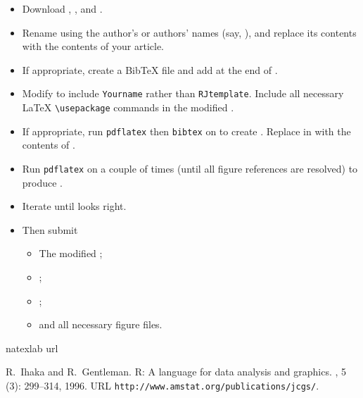 \begin{itemize}

\item Download , ,
and .

\item Rename  using the author's or authors' names
(say, ), and replace its
contents with the contents of your article.

\item If appropriate, create a  BibTeX file and add
\verb|| at the end of .

\item Modify  to include {\tt Yourname} rather
than {\tt RJtemplate}. Include all necessary \LaTeX{} \verb|\usepackage|
commands in the modified .

\item If appropriate, run {\tt pdflatex} then
 {\tt bibtex} on 
to create . Replace
\verb||
in  with
the contents of .

\item Run {\tt pdflatex} on  a couple of times
(until all figure references are resolved) to produce .

\item Iterate until  looks right.

\item Then submit
  \begin{itemize}
  \item The modified ;
  \item {};
  \item {};
  \item and all necessary figure files.
  \end{itemize}
\end{itemize}


\begin{thebibliography}{1}
\expandafter\ifx\csname natexlab\endcsname\relax\def\natexlab#1{#1}\fi
\expandafter\ifx\csname url\endcsname\relax
  \def\url#1{{\tt #1}}\fi

R.~Ihaka and R.~Gentleman.
\newblock R: A language for data analysis and graphics.
, 5
  (3): 299--314, 1996.
\newblock URL \url{http://www.amstat.org/publications/jcgs/}.

\end{thebibliography}




